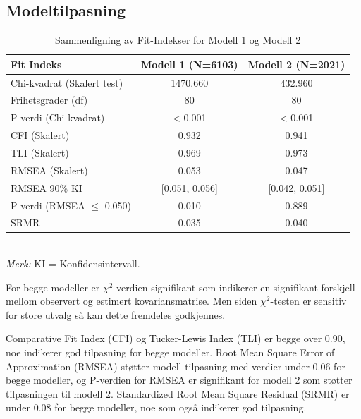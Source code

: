 \documentclass[
  12pt,
  a4paper,
  DIV=11,
  numbers=noendperiod]{scrartcl}
\begin{document}
\subsection{Modeltilpasning}\label{modeltilpasning}

\begin{table}[htbp]
\centering
\caption{Sammenligning av Fit-Indekser for Modell 1 og Modell 2}
\label{tab:fit_comparison_model1_model2}
\begin{tabular}{@{}lcc@{}}
\toprule
Fit Indeks                      & Modell 1 (N=6103) & Modell 2 (N=2021) \\
\midrule
Chi-kvadrat (Skalert test)      & 1470.660          & 432.960           \\
Frihetsgrader (df)              & 80                & 80                \\
P-verdi (Chi-kvadrat)           & < 0.001           & < 0.001           \\
CFI (Skalert)                   & 0.932             & 0.941             \\
TLI (Skalert)                   & 0.969             & 0.973             \\
RMSEA (Skalert)                 & 0.053             & 0.047             \\
RMSEA 90\% KI                   & [0.051, 0.056]    & [0.042, 0.051]    \\
P-verdi (RMSEA $\le$ 0.050)     & 0.010             & 0.889             \\
SRMR                            & 0.035             & 0.040             \\
\bottomrule
\end{tabular}
\raggedright
\footnotesize{\\
\textit{Merk:} KI = Konfidensintervall.
}
\end{table}

For begge modeller er \(\chi^2\)-verdien signifikant som indikerer en
signifikant forskjell mellom observert og estimert kovariansmatrise. Men
siden \(\chi^2\)-testen er sensitiv for store utvalg så kan dette
fremdeles godkjennes.

Comparative Fit Index (CFI) og Tucker-Lewis Index (TLI) er begge over
0.90, noe indikerer god tilpasning for begge modeller. Root Mean Square
Error of Approximation (RMSEA) støtter modell tilpasning med verdier
under 0.06 for begge modeller, og P-verdien for RMSEA er signifikant for
modell 2 som støtter tilpasningen til modell 2. Standardized Root Mean
Square Residual (SRMR) er under 0.08 for begge modeller, noe som også
indikerer god tilpasning.
\end{document}
